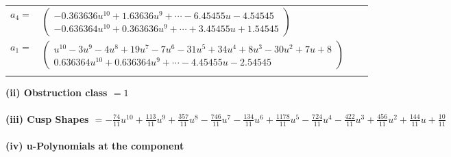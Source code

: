 \documentclass[1p]{elsarticle_modified}
\theoremstyle{definition}
\begin{document}
\begin{tabular}{m{7pt} m{180pt} m{7pt} m{180pt} }
\flushright $a_{4}=$&$\begin{pmatrix}-0.363636 u^{10}+1.63636 u^{9}+\cdots-6.45455 u-4.54545\\-0.636364 u^{10}+0.363636 u^{9}+\cdots+3.45455 u+1.54545\end{pmatrix}$ \\
\flushright $a_{1}=$&$\begin{pmatrix}u^{10}-3 u^9-4 u^8+19 u^7-7 u^6-31 u^5+34 u^4+8 u^3-30 u^2+7 u+8\\0.636364 u^{10}+0.636364 u^{9}+\cdots-4.45455 u-2.54545\end{pmatrix}$\\&\end{tabular}
\flushleft \textbf{(ii) Obstruction class $= 1$}\\~\\
\flushleft \textbf{(iii) Cusp Shapes $= -\frac{74}{11} u^{10}+\frac{113}{11} u^9+\frac{357}{11} u^8-\frac{746}{11} u^7-\frac{134}{11} u^6+\frac{1178}{11} u^5-\frac{724}{11} u^4-\frac{422}{11} u^3+\frac{456}{11} u^2+\frac{144}{11} u+\frac{10}{11}$}\\~\\
\newpage\renewcommand{\arraystretch}{1}
\flushleft \textbf{(iv) u-Polynomials at the component}\newline \\
\end{document}
